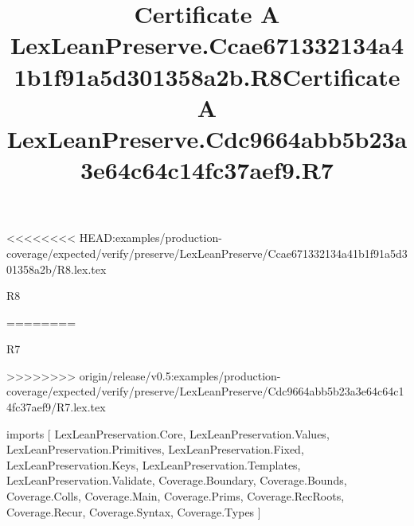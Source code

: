 <<<<<<<< HEAD:examples/production-coverage/expected/verify/preserve/LexLeanPreserve/Ccae671332134a41b1f91a5d301358a2b/R8.lex.tex
\begin{lexlean}{R8}
\title{Certificate A LexLeanPreserve.Ccae671332134a41b1f91a5d301358a2b.R8}
========
\begin{lexlean}{R7}
\title{Certificate A LexLeanPreserve.Cdc9664abb5b23a3e64c64c14fc37aef9.R7}
>>>>>>>> origin/release/v0.5:examples/production-coverage/expected/verify/preserve/LexLeanPreserve/Cdc9664abb5b23a3e64c64c14fc37aef9/R7.lex.tex
\begin{coremodule}
imports [
  LexLeanPreservation.Core,
  LexLeanPreservation.Values,
  LexLeanPreservation.Primitives,
  LexLeanPreservation.Fixed,
  LexLeanPreservation.Keys,
  LexLeanPreservation.Templates,
  LexLeanPreservation.Validate,
  Coverage.Boundary,
  Coverage.Bounds,
  Coverage.Colls,
  Coverage.Main,
  Coverage.Prims,
  Coverage.RecRoots,
  Coverage.Recur,
  Coverage.Syntax,
  Coverage.Types
]


\end{coremodule}
\end{lexlean}
\end{lexlean}
